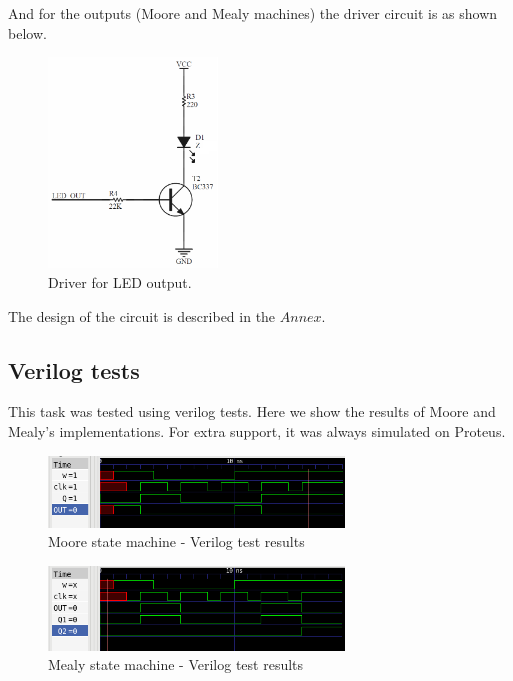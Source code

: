 And for the outputs (Moore and Mealy machines) 
the driver circuit is as shown below.

\begin{figure}[H]
    \begin{centering}
    \includegraphics[width=0.4\textwidth]{data/Graficos3/LED_Driver.png}
    \par\end{centering}
    \caption{Driver for LED output.}
\end{figure}

The design of the circuit is described in the $Annex$.
\subsection *{Verilog tests}
This task was tested using verilog tests. Here we show the results of Moore and Mealy's implementations.
For extra support, it was always simulated on Proteus.

\begin{figure}[H]
    \begin{centering}
    \includegraphics[width=0.7\textwidth]{data/Graficos3/3b.png}
    \par\end{centering}
    \caption{Moore state machine - Verilog test results}
\end{figure}

\begin{figure}[H]
    \begin{centering}
    \includegraphics[width=0.7\textwidth]{data/Graficos3/3a.png}
    \par\end{centering}
    \caption{Mealy state machine - Verilog test results}
\end{figure}






